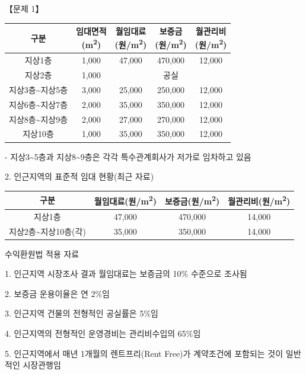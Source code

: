 \begin{longquestion}{【문제 1】}
{\small\centering
\begin{tabular}{|c|c|c|c|c|}\hline
구분 & \makecell{임대면적\\(m\textsuperscript{2})} & \makecell{월임대료\\(원/m\textsuperscript{2})} & \makecell{보증금\\(원/m\textsuperscript{2})} & \makecell{월관리비\\(원/m\textsuperscript{2})} \\\hline
지상1층 & 1,000 & 47,000 & 470,000 & 12,000 \\\hline
지상2층 & 1,000 & \multicolumn{3}{c|}{공실} \\\hline
지상3층\textasciitilde{}지상5층 & 3,000 & 25,000 & 250,000 & 12,000 \\\hline
지상6층\textasciitilde{}지상7층 & 2,000 & 35,000 & 350,000 & 12,000 \\\hline
지상8층\textasciitilde{}지상9층 & 2,000 & 27,000 & 270,000 & 12,000 \\\hline
지상10층 & 1,000 & 35,000 & 350,000 & 12,000 \\\hline
\end{tabular}\par}
- 지상3\textasciitilde{}5층과 지상8\textasciitilde{}9층은 각각 특수관계회사가 저가로 임차하고 있음 \par
2. 인근지역의 표준적 임대 현황(최근 자료) \par
{\small\centering
\begin{tabular}{|c|c|c|c|}\hline
구분 & 월임대료(원/m\textsuperscript{2}) & 보증금(원/m\textsuperscript{2}) & 월관리비(원/m\textsuperscript{2}) \\\hline
지상1층 & 47,000 & 470,000 & 14,000 \\\hline
지상2층\textasciitilde{}지상10층(각) & 35,000 & 350,000 & 14,000 \\\hline
\end{tabular}\par}
\medskip{} 수익환원법 적용 자료 \par
1. 인근지역 시장조사 결과 월임대료는 보증금의 10\% 수준으로 조사됨 \par
2. 보증금 운용이율은 연 2\%임 \par
3. 인근지역 건물의 전형적인 공실률은 5\%임 \par
4. 인근지역의 전형적인 운영경비는 관리비수입의 65\%임 \par
5. 인근지역에서 매년 1개월의 렌트프리(Rent Free)가 계약조건에 포함되는 것이 일반적인 시장관행임 \par

\end{longquestion}
